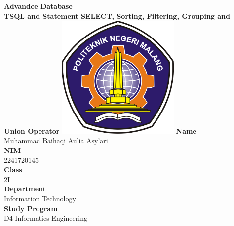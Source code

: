 \documentclass[12pt,titlepage]{article}
\newcommand{\vSubject}{Advandce Database}
\newcommand{\vSubtitle}{TSQL and Statement
SELECT, Sorting, Filtering, Grouping and Union Operator}
\newcommand{\vName}{Muhammad Baihaqi Aulia Asy'ari}
\newcommand{\vNIM}{2241720145}
\newcommand{\vClass}{2I}
\newcommand{\vDepartment}{Information Technology}
\newcommand{\vStudyProgram}{D4 Informatics Engineering}
\begin{document}
\begin{titlepage}
    \centering
    \vfill
    {\bfseries\LARGE
        \vSubject\\
        \vskip0.25cm
        \vSubtitle
    }
    \vfill
    \includegraphics[width=6cm]{images/polinema-logo.png}
    \vfill
    {
        \textbf{Name}\\
        \vName\\
        \vskip0.5cm
        \textbf{NIM}\\
        \vNIM\\
        \vskip0.5cm
        \textbf{Class}\\
        \vClass\\
        \vskip0.5cm
        \textbf{Department}\\
        \vDepartment\\
        \vskip0.5cm
        \textbf{Study Program}\\
        \vStudyProgram
    }
\end{titlepage}

\newpage
\end{document}
